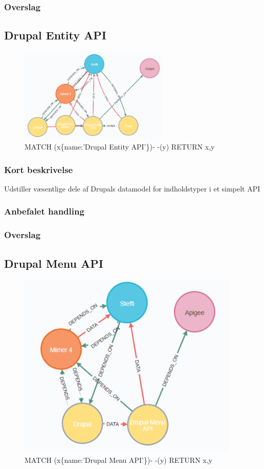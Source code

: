 \documentclass{article}
\begin{document}
\subsubsection{Overslag}


\subsection{Drupal Entity API}
\begin{figure}[h]
\includegraphics[width=200pt]{DrupalEntityAPI.PNG}
\caption{MATCH (x\{name:'Drupal Entity API'\})- -(y) RETURN x,y}
\end{figure}
\subsubsection{Kort beskrivelse}
Udstiller væsentlige dele af Drupals datamodel for indholdstyper i et simpelt API
\subsubsection{Anbefalet handling}
\subsubsection{Overslag}



\subsection{Drupal Menu API}
\begin{figure}[h]
\includegraphics[width=300pt]{DrupalMenuAPI.PNG}
\caption{MATCH (x\{name:'Drupal Menu API'\})- -(y) RETURN x,y}
\end{figure}
\end{document}
